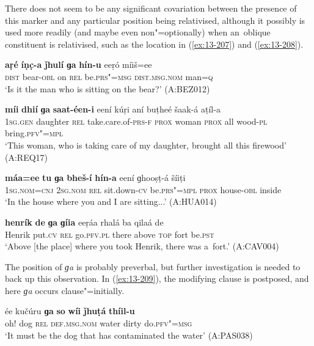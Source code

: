 There does not seem to be any significant covariation between the presence of this marker and any particular position being relativised, although it possibly is used more readily (and maybe even non"=optionally) when an~oblique constituent is relativised, such as the location in (\ref{ex:13-207}) and (\ref{ex:13-208}). 

\begin{exe}
\ex
\label{ex:13-205}
\gll \textbf{aṛé} \textbf{íṇc̣-a} \textbf{ǰhulí} \textbf{ɡa} \textbf{hín-u} eeṛó  míiš=ee \\
\textsc{dist} bear-\textsc{obl} on \textsc{rel} be.\textsc{prs"=msg} \textsc{dist.msg.nom}   man=\textsc{q} \\
\glt `Is it the man who is sitting on the bear?' (A:BEZ012)

\ex
\label{ex:13-206}
\gll \textbf{míi} \textbf{dhií} \textbf{ɡa} \textbf{saat-éen-i} eení kúṛi  aní buṭheé šaak-á aṭíl-a \\
\textsc{1sg.gen} daughter \textsc{rel} take.care.of-\textsc{prs-f} \textsc{prox} woman \textsc{prox} all wood-\textsc{pl} bring.\textsc{pfv"=mpl} \\
\glt `This woman, who is taking care of my daughter, brought all this firewood' (A:REQ17)

\ex
\label{ex:13-207}
\gll \textbf{máa=ee} \textbf{tu} \textbf{ɡa} \textbf{bheš-í} \textbf{hín-a}  eení ɡhooṣṭ-á šíiṭi\\
\textsc{1sg.nom=cnj} \textsc{2sg.nom} \textsc{rel} sit.down-\textsc{cv} be.\textsc{prs"=mpl} \textsc{prox} house-\textsc{obl} inside\\
\glt `In the house where you and I are sitting...' (A:HUA014)

\ex
\label{ex:13-208}
\gll \label{bkm:Ref190845659}\textbf{henrík} \textbf{de} \textbf{ɡa} \textbf{ɡíia} eeṛáa rhalá ba  qilaá de \\
Henrik put.\textsc{cv} \textsc{rel} go.\textsc{pfv.pl}  there above \textsc{top} fort be.\textsc{pst } \\
\glt `Above [the place] where you took Henrik, there was a~fort.' (A:CAV004) 
\end{exe}

The position of \textit{ɡa} is probably preverbal, but further investigation is needed to back up this observation. In (\ref{ex:13-209}), the modifying clause is postposed, and here \textit{ɡa} occurs clause"=initially.

\begin{exe}
\ex
\label{ex:13-209}
\gll ée kučúru \textbf{ɡa} \textbf{so} \textbf{wíi} \textbf{ǰhuṭá} \textbf{thíil-u}  \\
oh! dog \textsc{rel} \textsc{def.msg.nom} water dirty do.\textsc{pfv"=msg} \\
\glt `It must be the dog that has contaminated the water' (A:PAS038) 
\end{exe}

